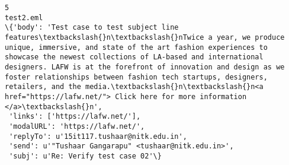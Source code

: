 \documentclass[11pt]{article}
\begin{document}
    \begin{Verbatim}[commandchars=\\\{\}]
5
test2.eml
\{'body': 'Test case to test subject line features\textbackslash{}n\textbackslash{}nTwice a year, we produce unique, immersive, and state of the art fashion experiences to showcase the newest collections of LA-based and international designers. LAFW is at the forefront of innovation and design as we foster relationships between fashion tech startups, designers, retailers, and the media.\textbackslash{}n\textbackslash{}n<a href="https://lafw.net/"> Click here for more information </a>\textbackslash{}n',
 'links': ['https://lafw.net/'],
 'modalURL': 'https://lafw.net/',
 'replyTo': u'15it117.tushaar@nitk.edu.in',
 'send': u'"Tushaar Gangarapu" <tushaar@nitk.edu.in>',
 'subj': u'Re: Verify test case 02'\}

    \end{Verbatim}
\end{document}
